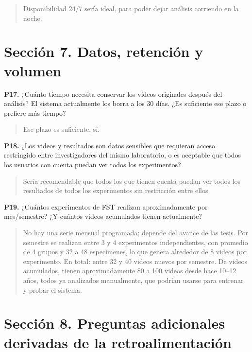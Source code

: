 \begin{quote}
Disponibilidad 24/7 sería ideal, para poder dejar análisis corriendo en la noche.
\end{quote}

\section*{Sección 7. Datos, retención y volumen}

\textbf{P17.} ¿Cuánto tiempo necesita conservar los videos originales después del
análisis? El sistema actualmente los borra a los 30 días. ¿Es suficiente ese plazo o
prefiere más tiempo?

\begin{quote}
Ese plazo es suficiente, sí.
\end{quote}

\textbf{P18.} ¿Los videos y resultados son datos sensibles que requieran acceso
restringido entre investigadores del mismo laboratorio, o es aceptable que todos los
usuarios con cuenta puedan ver todos los experimentos?

\begin{quote}
Sería recomendable que todos los que tienen cuenta puedan ver todos los resultados de
todos los experimentos sin restricción entre ellos.
\end{quote}

\textbf{P19.} ¿Cuántos experimentos de FST realizan aproximadamente por mes/semestre?
¿Y cuántos videos acumulados tienen actualmente?

\begin{quote}
No hay una serie mensual programada; depende del avance de las tesis. Por semestre se
realizan entre 3 y 4 experimentos independientes, con promedio de 4 grupos y 32 a 48
especímenes, lo que genera alrededor de 8 videos por experimento. En total: entre 32 y
40 videos nuevos por semestre. De videos acumulados, tienen aproximadamente 80 a 100
videos desde hace 10--12 años, todos ya analizados manualmente, que podrían usarse para
entrenar y probar el sistema.
\end{quote}

\section*{Sección 8. Preguntas adicionales derivadas de la retroalimentación}

